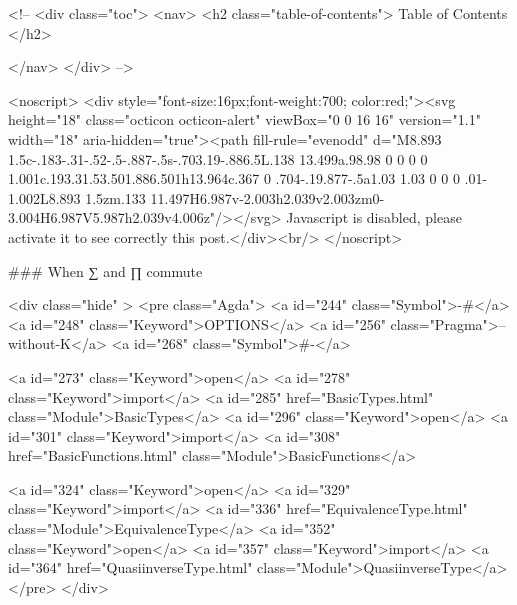   <!-- 
  <div class="toc">
    <nav>
    <h2 class="table-of-contents"> Table of Contents </h2>
      

    </nav>
  </div>
   -->

  <noscript>
  <div style="font-size:16px;font-weight:700; color:red;"><svg height="18" class="octicon octicon-alert" viewBox="0 0 16 16" version="1.1" width="18" aria-hidden="true"><path fill-rule="evenodd" d="M8.893 1.5c-.183-.31-.52-.5-.887-.5s-.703.19-.886.5L.138 13.499a.98.98 0 0 0 0 1.001c.193.31.53.501.886.501h13.964c.367 0 .704-.19.877-.5a1.03 1.03 0 0 0 .01-1.002L8.893 1.5zm.133 11.497H6.987v-2.003h2.039v2.003zm0-3.004H6.987V5.987h2.039v4.006z"/></svg> Javascript is disabled, please activate it to see correctly this post.</div><br/>
  </noscript>

  ### When ∑ and ∏ commute


<div class="hide" >
<pre class="Agda">
<a id="244" class="Symbol">{-#</a> <a id="248" class="Keyword">OPTIONS</a> <a id="256" class="Pragma">--without-K</a> <a id="268" class="Symbol">#-}</a>

<a id="273" class="Keyword">open</a> <a id="278" class="Keyword">import</a> <a id="285" href="BasicTypes.html" class="Module">BasicTypes</a>
<a id="296" class="Keyword">open</a> <a id="301" class="Keyword">import</a> <a id="308" href="BasicFunctions.html" class="Module">BasicFunctions</a>

<a id="324" class="Keyword">open</a> <a id="329" class="Keyword">import</a> <a id="336" href="EquivalenceType.html" class="Module">EquivalenceType</a>
<a id="352" class="Keyword">open</a> <a id="357" class="Keyword">import</a> <a id="364" href="QuasiinverseType.html" class="Module">QuasiinverseType</a>
</pre>
</div>


